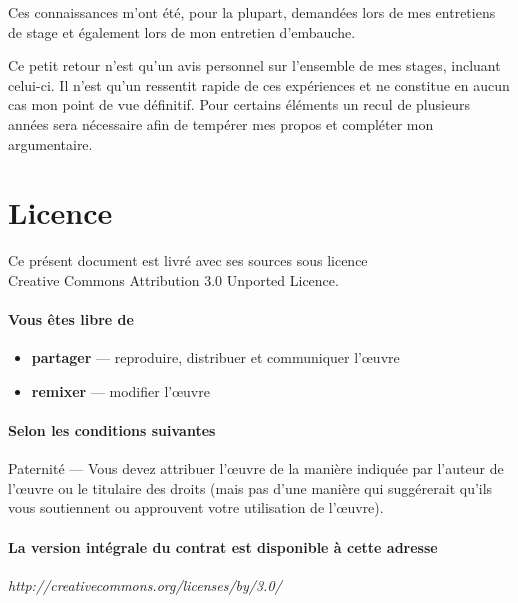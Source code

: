 \documentclass[12pt,a4paper]{book}
\begin{document}
Ces connaissances m'ont été, pour la plupart, demandées lors de mes entretiens de stage et également lors de  mon entretien d'embauche.

Ce petit retour n'est qu'un avis personnel sur l'ensemble de mes stages, incluant celui-ci. Il n'est qu'un ressentit rapide de ces expériences et ne constitue en aucun cas mon point de vue définitif. Pour certains éléments un recul de plusieurs années sera nécessaire afin de tempérer mes propos et compléter mon argumentaire.

\listoffigures

\printglossaries

\newpage
{}
\section*{Licence}
\begin{center}
Ce présent document est livré avec ses sources sous licence\\
\ccby Creative Commons Attribution 3.0 Unported Licence.
\end{center}

\paragraph*{Vous êtes libre de}

\begin{itemize}
\item \textbf{partager} — reproduire, distribuer et communiquer l'\oe uvre
\item \textbf{remixer} — modifier l'\oe uvre
\end{itemize}

\paragraph*{Selon les conditions suivantes}
Paternité — Vous devez attribuer l'\oe uvre de la manière indiquée par l'auteur de l'\oe uvre ou le titulaire des droits (mais pas d'une manière qui suggérerait qu'ils vous soutiennent ou approuvent votre utilisation de l'\oe uvre). 

\paragraph*{La version intégrale du contrat est disponible à cette adresse}

\begin{center}
\textit{http://creativecommons.org/licenses/by/3.0/}
\end{center}
\end{document}
